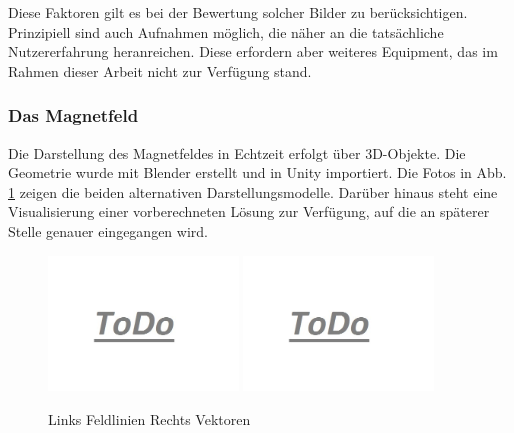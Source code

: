 Diese Faktoren gilt es bei der Bewertung solcher Bilder zu berücksichtigen. Prinzipiell sind auch Aufnahmen möglich, die näher an die tatsächliche Nutzererfahrung heranreichen. Diese erfordern aber weiteres Equipment, das im Rahmen dieser Arbeit nicht zur Verfügung stand.

\subsubsection{Das Magnetfeld}
\label{sec-5-2-2}
Die Darstellung des Magnetfeldes in Echtzeit erfolgt über 3D-Objekte. Die Geometrie wurde mit Blender erstellt und in Unity importiert. Die Fotos in Abb. \ref{img:mfield-result} zeigen die beiden alternativen Darstellungsmodelle. Darüber hinaus steht eine Visualisierung einer vorberechneten Lösung zur Verfügung, auf die an späterer Stelle genauer eingegangen wird.

\begin{figure}[H]
	\centering
	\includegraphics[width=0.45\textwidth]{images/todo.jpg}
	\hspace{0.05cm}	
	\includegraphics[width=0.45\textwidth]{images/todo.jpg}
	\caption{Links Feldlinien Rechts Vektoren}
	\label{img:mfield-result}
\end{figure}


